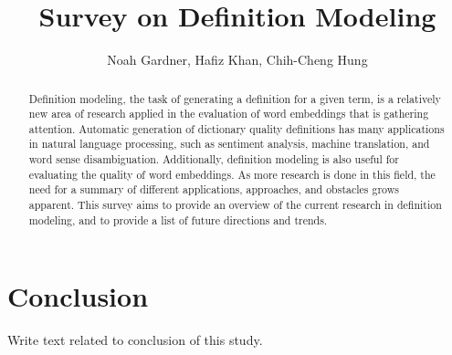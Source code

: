 \documentclass{aci}
\numberwithin{equation}{section}
\begin{document}
\title{Survey on Definition Modeling}

\author{%
    Noah Gardner,
    Hafiz Khan,
    Chih-Cheng Hung\corrauth
}%


\address{%
    }

\begin{abstract}
    Definition modeling, the task of generating a definition for a given term,
    is a relatively new area of research applied in the evaluation of word
    embeddings that is gathering attention. Automatic generation of dictionary
    quality definitions has many applications in natural language processing,
    such as sentiment analysis, machine translation, and word sense
    disambiguation. Additionally, definition modeling is also useful for
    evaluating the quality of word embeddings. As more research is done in this
    field, the need for a summary of different applications, approaches, and
    obstacles grows apparent. This survey aims to provide an overview of the
    current research in definition modeling, and to provide a list of future
    directions and trends.
\end{abstract}
\maketitle






\FloatBarrier


\FloatBarrier
\section{Conclusion}
Write text related to conclusion of this study.

\printbibliography
\end{document}
